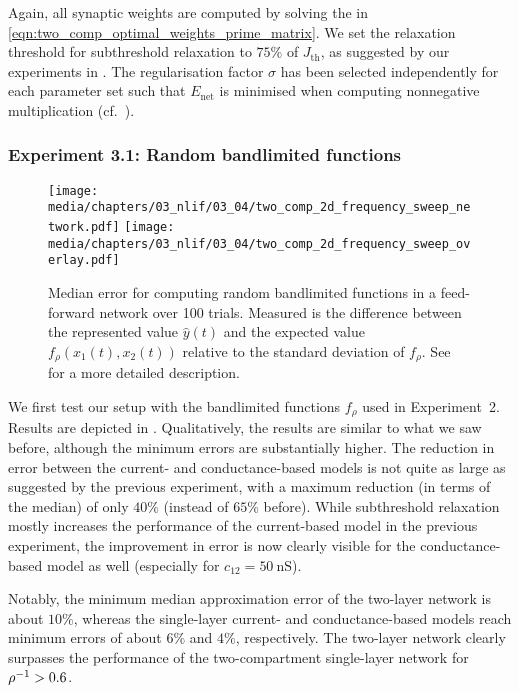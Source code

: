 Again, all synaptic weights are computed by solving the \QP in \cref{eqn:two_comp_optimal_weights_prime_matrix}.
We set the relaxation threshold for subthreshold relaxation to $75\%$ of $J_\mathrm{th}$, as suggested by our experiments in .
The regularisation factor $\sigma$ has been selected independently for each parameter set such that $E_\mathrm{net}$ is minimised when computing nonnegative multiplication (cf.~).

\subsubsection{Experiment 3.1: Random bandlimited functions}

\begin{figure}[t]
	\centering
	{\texttt{[image: media/chapters/03\_nlif/03\_04/two\_comp\_2d\_frequency\_sweep\_network.pdf]}}%
	\kern-158.06mm\texttt{[image: media/chapters/03\_nlif/03\_04/two\_comp\_2d\_frequency\_sweep\_overlay.pdf]}
	\caption[Median error for computing random bandlimited functions in a feed-forward network over 100 trials]{Median error for computing random bandlimited functions in a feed-forward network over 100 trials. Measured \NRMSE is the difference between the represented value $\hat y(t)$ and the expected value $f_\rho(x_1(t), x_2(t))$ relative to the standard deviation of $f_\rho$. See  for a more detailed description.}
	\label{fig:frequency_sweep_network}
\end{figure}

We first test our setup with the bandlimited functions $f_\rho$ used in Experiment~2.
Results are depicted in .
Qualitatively, the results are similar to what we saw before, although the minimum errors are substantially higher.
The reduction in error between the current- and conductance-based models is not quite as large as suggested by the previous experiment, with a maximum reduction (in terms of the median) of only $40\%$ (instead of $65\%$ before).
While subthreshold relaxation mostly increases the performance of the current-based model in the previous experiment, the improvement in error is now clearly visible for the conductance-based model as well (especially for $c_{12} = \SI{50}{\nano\siemens}$).

Notably, the minimum median approximation error of the two-layer network is about $10\%$, whereas the single-layer current- and conductance-based models reach minimum errors of about $6\%$ and $4\%$, respectively. The two-layer network clearly surpasses the performance of the two-compartment \LIF single-layer network for ${\rho^{-1}} > 0.6$.

